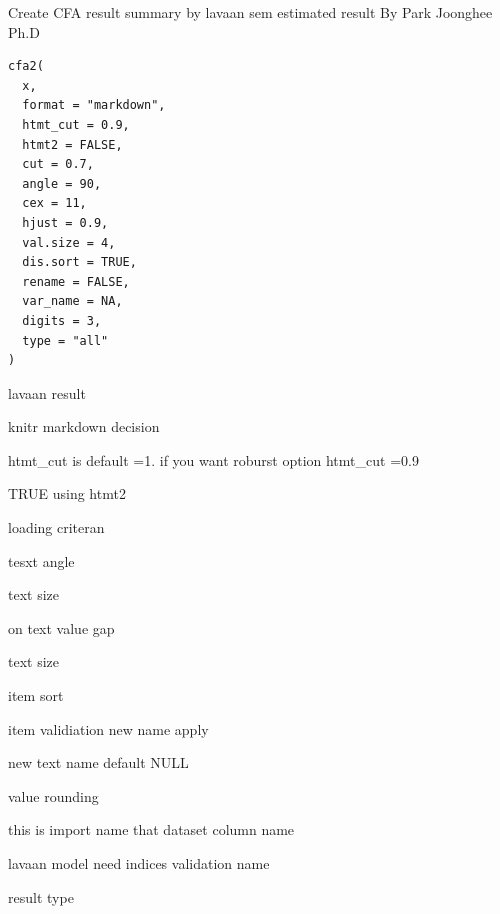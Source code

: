 \documentclass[a4paper]{book}
\begin{document}
%
\begin{Description}
Create CFA result summary by lavaan sem estimated result By Park Joonghee Ph.D
\end{Description}
%
\begin{Usage}
\begin{verbatim}
cfa2(
  x,
  format = "markdown",
  htmt_cut = 0.9,
  htmt2 = FALSE,
  cut = 0.7,
  angle = 90,
  cex = 11,
  hjust = 0.9,
  val.size = 4,
  dis.sort = TRUE,
  rename = FALSE,
  var_name = NA,
  digits = 3,
  type = "all"
)
\end{verbatim}
\end{Usage}
%
\begin{Arguments}
\begin{ldescription}
\item[\code{x}] lavaan result

\item[\code{format}] knitr markdown decision

\item[\code{htmt\_cut}] htmt\_cut is default =1.
if you want roburst option htmt\_cut =0.9

\item[\code{htmt2}] TRUE using htmt2

\item[\code{cut}] loading criteran

\item[\code{angle}] tesxt angle

\item[\code{cex}] text size

\item[\code{hjust}] on text value gap

\item[\code{val.size}] text size

\item[\code{dis.sort}] item sort

\item[\code{rename}] item validiation new name apply

\item[\code{var\_name}] new text name default NULL

\item[\code{digits}] value rounding

\item[\code{dataset}] this is import name that dataset column name

\item[\code{model}] lavaan model need indices validation name

\item[\code{res}] result type
\end{ldescription}
\end{Arguments}
\end{document}
